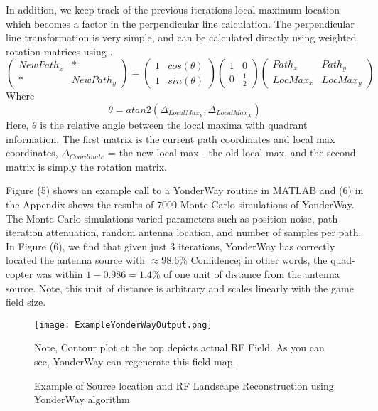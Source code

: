 \documentclass[11pt,letterpaper,titlepage]{article}
\begin{document}
\begin{onehalfspace}
\noindent
In addition, we keep track of the previous iterations local maximum location which becomes a factor in the perpendicular line calculation. The perpendicular line transformation is very simple, and can be calculated directly using weighted rotation matrices using . 
\begin{equation}
\left(\begin{matrix}
NewPath_x & *  \\ 
* & NewPath_y
\end{matrix} 
\right)
=
\left(\begin{matrix}
1 & cos(\theta) \\ 
1 & sin(\theta) 
\end{matrix} \right)
\left(\begin{matrix}
1 & 0 \\ 
0 & \frac{1}{2} 
\end{matrix}\right)
\left(
\begin{matrix}
Path_x & Path_y \\ 
LocMax_x & LocMax_y
\end{matrix} 
\right)
\end{equation}
Where $$\theta = atan2(\Delta_{LocalMax_Y}, \Delta_{LocalMax_X})$$
Here, $\theta$ is the relative angle between the local maxima with quadrant information. The first matrix is the current path coordinates and local max coordinates, $\Delta_{Coordinate}$ = the new local max - the old local max, and the second matrix is simply the rotation matrix.

\noindent
Figure (5) shows an example call to a YonderWay routine in MATLAB and (6) in the Appendix shows the results of 7000 Monte-Carlo simulations of YonderWay. The Monte-Carlo simulations varied parameters such as position noise, path iteration attenuation, random antenna location, and number of samples per path. In Figure (6), we find that given just 3 iterations, YonderWay has correctly located the antenna source with $\approx98.6\%$ Confidence; in other words, the quad-copter was within $1-0.986 = 1.4\%$ of one unit of distance from the antenna source. Note, this unit of distance is arbitrary and scales linearly with the game field size.
\begin{wrapfigure}{lc}{0.7\textwidth}
\centering
\texttt{[image: ExampleYonderWayOutput.png]}
\caption{Example of Source location and
 RF Landscape Reconstruction using YonderWay algorithm}
 Note, Contour plot at the top depicts actual RF Field. As you can see, YonderWay can regenerate this field map.
\end{wrapfigure}

\end{onehalfspace} 
\end{document}
